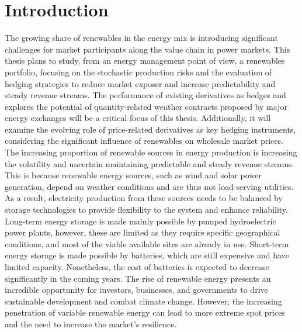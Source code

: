 
%

\chapter{Introduction}
\label{ch:introduction}

\glsresetall


  The growing share of renewables in the energy mix is introducing significant challenges for market participants
  along the value chain in power markets\cite{hain_managing_2018}.
  This thesis plans to study, from an energy management point of view, a renewables portfolio,
  focusing on the stochastic production risks and the evaluation of hedging strategies
  to reduce market exposer and increase predictability and steady revenue streams.
  The performance of existing derivatives as hedges and explores the potential of quantity-related weather contracts
  proposed by major energy exchanges will be a critical focus of this thesis.
  Additionally, it will examine the evolving role of price-related derivatives as key hedging instruments,
  considering the significant influence of renewables on wholesale market prices.\\

  The increasing proportion of renewable sources in energy production is increasing the volatility and uncertain
  maintaining predictable and steady revenue streams.
  This is because renewable energy sources, such as wind and solar power generation,
  depend on weather conditions and are thus not load-serving utilities.
  As a result, electricity production from these sources needs
  to be balanced by storage technologies to provide flexibility to the system and enhance reliability.
  Long-term energy storage is made mainly possible by pumped hydroelectric power plants,
  however, these are limited as they require specific geographical conditions,
  and most of the viable available sites are already in use.
  Short-term energy storage is made possible by batteries, which are still expensive and have limited capacity.
  Nonetheless, the cost of batteries is expected to decrease significantly in the coming
  years\cite{viswanathan_2022_2022, cole_cost_2023}.
  The rise of renewable energy presents an incredible opportunity for investors,
  businesses, and governments to drive sustainable development and combat climate change.
  However, the increasing penetration of variable renewable energy can lead to more extreme spot prices and the need
  to increase the market's resilience. \\

